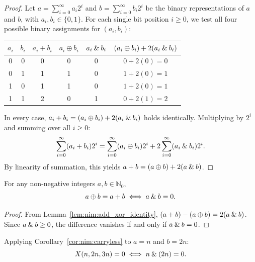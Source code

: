 ﻿\documentclass[a4paper]{article}
\begin{document}
\begin{proof}
Let $a = \sum_{i=0}^\infty a_i 2^i$ and $b = \sum_{i=0}^\infty b_i 2^i$ be the binary representations of $a$ and $b$, with $a_i, b_i \in \{0, 1\}$.
For each single bit position $i \ge 0$, we test all four possible binary assignments for $(a_i, b_i)$:

\begin{center}
\begin{tabular}{cccccc}
\toprule
$a_i$ & $b_i$ & $a_i + b_i$ & $a_i \oplus b_i$ & $a_i \mathbin{\&} b_i$ & $(a_i \oplus b_i) + 2(a_i \mathbin{\&} b_i)$ \\
\midrule
0 & 0 & 0 & 0 & 0 & $0 + 2(0) = 0$ \\
0 & 1 & 1 & 1 & 0 & $1 + 2(0) = 1$ \\
1 & 0 & 1 & 1 & 0 & $1 + 2(0) = 1$ \\
1 & 1 & 2 & 0 & 1 & $0 + 2(1) = 2$ \\
\bottomrule
\end{tabular}
\end{center}

In every case, $a_i + b_i = (a_i \oplus b_i) + 2(a_i \mathbin{\&} b_i)$ holds identically.
Multiplying by $2^i$ and summing over all $i \ge 0$:
\begin{equation}
\sum_{i=0}^\infty (a_i + b_i) 2^i = \sum_{i=0}^\infty (a_i \oplus b_i) 2^i + 2 \sum_{i=0}^\infty (a_i \mathbin{\&} b_i) 2^i.
\end{equation}
By linearity of summation, this yields $a + b = (a \oplus b) + 2(a \mathbin{\&} b)$.
\end{proof}

\begin{corollary}\label{cor:nim:carryless}
For any non-negative integers $a, b \in \mathbb{N}_0$,
\begin{equation}
a \oplus b = a + b \iff a \mathbin{\&} b = 0.
\end{equation}
\end{corollary}

\begin{proof}
From Lemma~\ref{lem:nim:add_xor_identity}, $(a + b) - (a \oplus b) = 2(a \mathbin{\&} b)$.
Since $a \mathbin{\&} b \ge 0$, the difference vanishes if and only if $a \mathbin{\&} b = 0$.
\end{proof}

Applying Corollary~\ref{cor:nim:carryless} to $a = n$ and $b = 2n$:
\begin{equation}\label{eq:nim:n_and_2n}
X(n, 2n, 3n) = 0 \iff n \mathbin{\&} (2n) = 0.
\end{equation}
\end{document}
